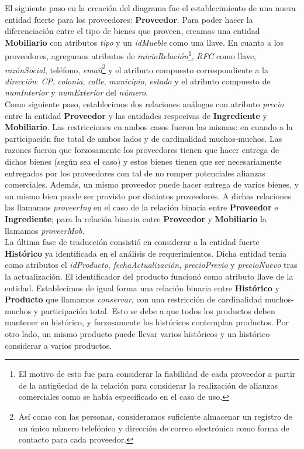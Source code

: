 \documentclass[11pt,letterpaper]{article}
\begin{document}
El siguiente paso en la creación del diagrama fue el establecimiento de una nueva entidad fuerte para los proveedores: \textbf{Proveedor}. Para poder hacer la diferenciación entre el tipo de bienes que proveen, creamos una entidad \textbf{Mobiliario} con atributos \textit{tipo} y un \textit{idMueble} como una llave. En cuanto a los proveedores, agregamos atributos de \textit{inicioRelación}\footnote{El motivo de esto fue para considerar la fiabilidad de cada proveedor a partir de la antigüedad de la relación para considerar la realización de alianzas comerciales como se había especificado en el caso de uso.}, \textit{RFC} como llave, \textit{razónSocial}, teléfono, \textit{email}\footnote{Así como con las personas, consideramos suficiente almacenar un registro de un único número telefónico y dirección de correo electrónico como forma de contacto para cada proveedor.} y el atributo compuesto correspondiente a la \textit{dirección}: \textit{CP}, \textit{colonia}, \textit{calle}, \textit{municipio}, \textit{estado} y el atributo compuesto de \textit{numInterior} y \textit{numExterior} del \textit{número}.\\

Como siguiente paso, establecimos dos relaciones análogas con atributo \textit{precio} entre la entidad \textbf{Proveedor} y las entidades respecivas de \textbf{Ingrediente} y \textbf{Mobiliario}. Las restricciones en ambos casos fueron las mismas: en cuando a la participación fue total de ambos lados y de cardinalidad muchos-muchos. Las razones fueron que forzosamente los proveedores tienen que hacer entrega de dichos bienes (según sea el caso) y estos bienes tienen que ser necesariamente entregados por los proveedores con tal de no romper potenciales alianzas comerciales. Además, un mismo proveedor puede hacer entrega de varios bienes, y un mismo bien puede ser provisto por distintos proveedores. A dichas relaciones las llamamos \textit{proveerIng} en el caso de la relación binaria entre \textbf{Proveedor} e \textbf{Ingrediente}; para la relación binaria entre \textbf{Proveedor} y \textbf{Mobiliario} la llamamos \textit{proveerMob}.\\

La última fase de traducción consistió en considerar a la entidad fuerte \textbf{Histórico} ya identificada en el análisis de requerimientos. Dicha entidad tenía como atributos el \textit{idProducto}, \textit{fechaActualización}, \textit{precioPrevio} y \textit{precioNuevo} tras la actualización. El identificador del producto funcionó como atributo llave de la entidad. Establecimos de igual forma una relación binaria entre \textbf{Histórico} y \textbf{Producto} que llamamos \textit{conservar}, con una restricción de cardinalidad muchos-muchos y participación total. Esto se debe a que todos los productos deben mantener su histórico, y forzosamente los históricos contemplan productos. Por otro lado, un mismo producto puede llevar varios históricos y un histórico considerar a varios productos.\\
\end{document}
